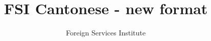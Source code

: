 \documentclass[UTF8]{ctexart}
\begin{document}
\title{FSI Cantonese - new format}
\author{Foreign Services Institute}

\maketitle

\tableofcontents

% 

% 


\end{document}
